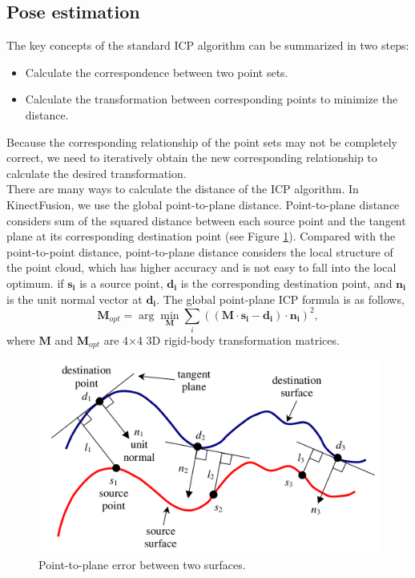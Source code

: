 \documentclass[a4paper,12pt]{article}
\begin{document}
\subsection{Pose estimation}
The key concepts of the standard ICP algorithm can be summarized in two steps\cite{inproceedings}:
\begin{itemize}
	\item[1.] Calculate the correspondence between two point sets.
	\item[2.] Calculate the transformation between corresponding points to minimize the distance.
\end{itemize}
Because the corresponding relationship of the point sets may not be completely correct, we need to iteratively obtain the new corresponding relationship to calculate the desired transformation. 
\\There are many ways to calculate the distance of the ICP algorithm. In KinectFusion, we use the global point-to-plane distance. 
Point-to-plane distance considers sum of the squared distance between each source point and the tangent plane at its corresponding destination point (see Figure \ref{figure4}).
Compared with the point-to-point distance, point-to-plane distance considers the local structure of the point cloud, which has higher accuracy and is not easy to fall into the local optimum. 
if $\mathbf{s_i}$ is a source point, $\mathbf{d_i} $ is the corresponding destination point, and $\mathbf{n_i}$ is the unit normal vector at $\mathbf{d_i}$.
The global point-plane ICP formula is as follows\cite{article},
\begin{equation}
	\mathbf{M}_{opt} = \arg\min_{\mathbf{M}}\sum_i(\mathbf{(M\cdot s_i-d_i)\cdot n_i})^2,
	\label{equ5}
\end{equation}
where $\mathbf{M}$ and $\mathbf{M}_{opt}$ are 4×4 3D rigid-body transformation matrices.
\begin{figure}[h] %
    \centering %
    \includegraphics[scale=0.3]{figure4.png} %
    \caption{Point-to-plane error between two surfaces\cite{article}.} %
    \label{figure4} %
\end{figure}%
\end{document}
